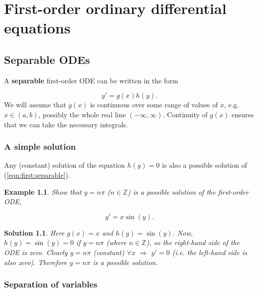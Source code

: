 \documentclass[a4paper]{report}
\newtheorem{example}{Example}[chapter]
\newtheorem*{solution}{Solution}
\begin{document}
\chapter{First-order ordinary differential equations}
\label{chap:first} 

\section{Separable ODEs}
\label{sec:first:sep}

A {\bf separable} first-order ODE can be written in the form

\begin{equation}
\label{eqn:first:separable}
y'=g(x)h(y).
\end{equation}
\noindent 
\noindent We will assume that $g(x)$ is continuous over some range of values of $x$, e.g. $x\in(a,b)$, possibly the whole real line $(-\infty,\infty)$. Continuity of $g(x)$ ensures that we can take the necessary integrals. 

\subsection{A simple solution}
\label{subsec:first:sepsimple}

Any (constant) solution of the equation $h(y)=0$ is also a possible solution of (\ref{eqn:first:separable}). 

\begin{example}
\label{ex:first:sepspecial}
Show that $y=n\pi$ ($n\in\mathbb{Z}$) is a possible solution of the first-order ODE,

\begin{displaymath} 
y'=x\sin(y).
\end{displaymath}
\end{example}

\begin{solution}
Here $g(x)=x$ and $h(y)=\sin(y)$. Now, $h(y)=\sin(y)=0$ if $y=n\pi$ (where $n\in\mathbb{Z}$), so the right-hand side of the ODE is zero. Clearly
$y=n\pi$ (constant) $\forall x$ $\Longrightarrow$ $y'=0$ (i.e. the left-hand side is also zero). Therefore $y=n\pi$ is a possible solution.
\end{solution}

\subsection{Separation of variables}
\label{subsec:first:sepmethod}
\end{document}
